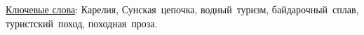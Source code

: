 {{\vspace{4mm}
\noindent \underline{Ключевые слова}: Карелия, Сунская~цепочка, водный~туризм, байдарочный~сплав, туристский~поход, походная~проза.

%
%
\vspace{4mm}
%

\noindent\makebox[\textwidth][s]{\textbf{\ISBN}\hfill{\copyright~\MyVarAuthorName,~\year}}
}

}